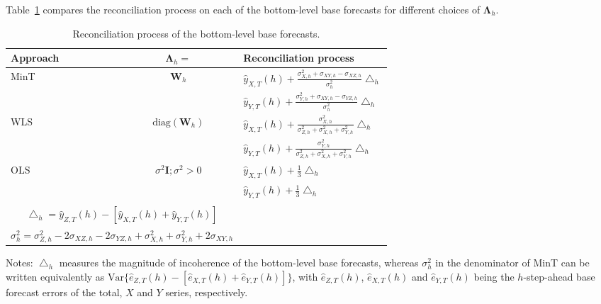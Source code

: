 \documentclass[10pt,a4paper]{article}
\begin{document}
\begin{enumerate}
{	Table~\ref{tbl:reconpros} compares the reconciliation process on each of the bottom-level base forecasts for different choices of $\bm{\Lambda}_h$.
	
	\begin{table}[ht]
		\caption{Reconciliation process of the bottom-level base forecasts.}
		\label{tbl:reconpros}
		\centering
		\begin{threeparttable}
			\begin{tabular}{lcl}
				\toprule
				Approach & $\bm{\Lambda}_h = $ & Reconciliation process\\
				\midrule
				MinT & $\bm{W}_{h}$ & $\displaystyle \hat{y}_{X, T}(h) + \frac{\sigma_{X, h}^{2} + \sigma_{XY, h} - \sigma_{XZ, h}}{\sigma_{h}^{2}}\bigtriangleup_{h}$\\[0.4cm]
				& & $ \displaystyle \hat{y}_{Y, T}(h) + \frac{\sigma^{2}_{Y, h} + \sigma_{XY, h} - \sigma_{YZ, h}}{\sigma_{h}^{2}}\bigtriangleup_{h}$\\[0.4cm]
				WLS & $\text{diag}(\bm{W}_h)$ & $\displaystyle\hat{y}_{X, T}(h) + \frac{\sigma^{2}_{X, h}}{\sigma^{2}_{Z, h} + \sigma^{2}_{X, h} + \sigma^{2}_{Y, h}}\bigtriangleup_{h}$\\[0.4cm]
				& & $\displaystyle \hat{y}_{Y, T}(h) + \frac{\sigma^{2}_{Y, h}}{\sigma^{2}_{Z, h} + \sigma^{2}_{X, h} + \sigma^{2}_{Y, h}}\bigtriangleup_{h}$\\[0.4cm]
				OLS & $\sigma^2\bm{I}; \sigma^2 > 0$ & $\displaystyle \hat{y}_{X, T}(h) + \frac{1}{3}\bigtriangleup_{h}$\\[0.4cm]
				& & $\displaystyle \hat{y}_{Y, T}(h) + \frac{1}{3}\bigtriangleup_{h}$\\
				\midrule
				\multicolumn{2}{l}{\text{where:}}\\[0.4cm]
				\multicolumn{2}{c}{$\displaystyle \bigtriangleup_{h} = \hat{y}_{Z, T}(h) - [\hat{y}_{X, T}(h) + \hat{y}_{Y, T}(h)]$}\\[0.4cm]
				\multicolumn{2}{c}{$\displaystyle \sigma_{h}^{2} = \sigma^{2}_{Z, h} - 2\sigma_{XZ, h} - 2\sigma_{YZ, h} + \sigma^{2}_{X, h} + \sigma^{2}_{Y, h} + 2\sigma_{XY, h}$}\\
				\bottomrule
			\end{tabular}
\end{threeparttable}
\end{table}}
\end{enumerate}
\end{document}
